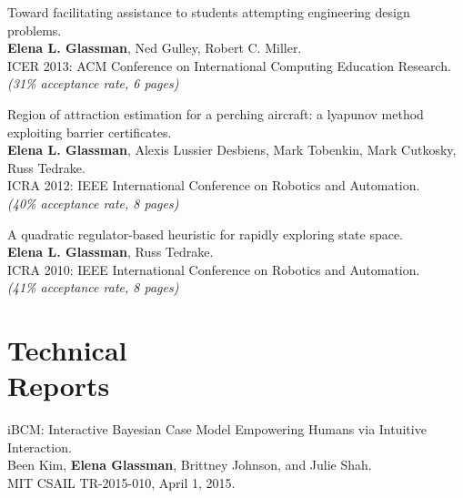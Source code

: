 \documentclass[margin]{res}
\begin{document}
\begin{resume}
Toward facilitating assistance to students attempting engineering design problems.\\
{\bf Elena L. Glassman}, Ned Gulley, Robert C. Miller. \\
ICER 2013: ACM Conference on International Computing Education Research.\\
{\it (31\% acceptance rate, 6 pages)}

Region of attraction estimation for a perching aircraft: a lyapunov method exploiting barrier certificates.\\
{\bf Elena L. Glassman}, Alexis Lussier Desbiens, Mark Tobenkin, Mark Cutkosky, Russ Tedrake.\\
ICRA 2012: IEEE International Conference on Robotics and Automation.\\
{\it (40\% acceptance rate, 8 pages)}

A quadratic regulator-based heuristic for rapidly exploring state space.\\
{\bf Elena L. Glassman}, Russ Tedrake.\\
ICRA 2010: IEEE International Conference on Robotics and Automation.\\ 
{\it (41\% acceptance rate, 8 pages)}

\section{Technical\\ Reports}

iBCM: Interactive Bayesian Case Model Empowering Humans via Intuitive Interaction.\\
Been Kim, {\bf Elena Glassman}, Brittney Johnson, and Julie Shah.\\
MIT CSAIL TR-2015-010, April 1, 2015.

\begin{comment}
\section{Conference Posters, Workshops, and Doctoral Consortium Papers}

Learner-Sourcing in an Engineering Class at Scale.\\
{\bf Elena L. Glassman}, Christopher J. Terman, Robert C. Miller.\\
L$@$S 2015: ACM Learning at Scale Conference.

Using and Designing Platforms for In Vivo Educational Experiments.\\
Joseph Jay Williams, Korinn Ostrow, Xi Xiong, {\bf Elena Glasman}, Juho Kim, Samuel Maldonado, Justin
Reich, Neil Heffernan.\\
L$@$S 2015: ACM Learning at Scale Conference.


\end{comment}
\end{resume}
\end{document}
